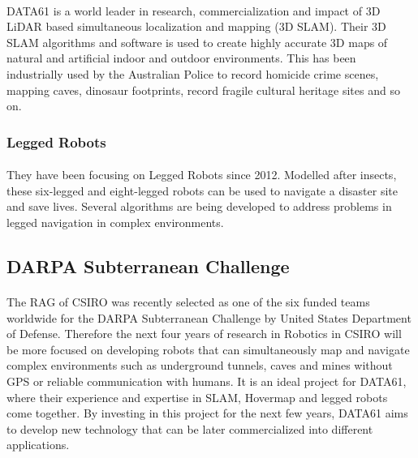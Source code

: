 \paragraph{}
DATA61 is a world leader in research, commercialization and impact of 3D LiDAR based simultaneous localization and mapping (3D SLAM). Their 3D SLAM algorithms and software is used to create highly accurate 3D maps of natural and artificial indoor and outdoor environments. This has been industrially used by the Australian Police to record homicide crime scenes, mapping caves, dinosaur footprints, record fragile cultural heritage sites and so on.

\subsubsection*{Legged Robots}
\paragraph{}
They have been focusing on Legged Robots since 2012. Modelled after insects, these six-legged and eight-legged robots can be used to navigate a disaster site and save lives. Several algorithms are being developed to address problems in legged navigation in complex environments.


\subsection{DARPA Subterranean Challenge}
\label{ssec:darpa}
\paragraph{}
The RAG of CSIRO was recently selected as one of the six funded teams worldwide for the DARPA Subterranean Challenge by United States Department of Defense. Therefore the next four years of research in Robotics in CSIRO will be more focused on developing robots that can simultaneously map and navigate complex environments such as underground tunnels, caves and mines without GPS or reliable communication with humans. It is an ideal project for DATA61, where their experience and expertise in SLAM, Hovermap and legged robots come together. By investing in this project for the next few years, DATA61 aims to develop new technology that can be later commercialized into different applications. 


